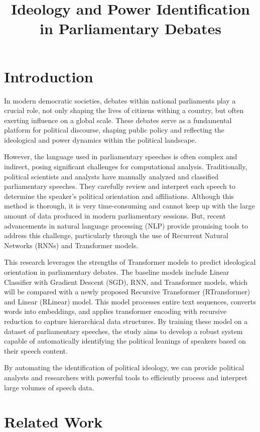 \documentclass[10pt, a4paper]{article}
\title{Ideology and Power Identification in Parliamentary Debates}
\begin{document}
\maketitleabstract

\section{Introduction}

In modern democratic societies, debates within national parliaments play a crucial role, not only shaping the lives of citizens withing a country, but often exerting influence on a global scale. These debates serve as a fundamental platform for political discourse, shaping public policy and reflecting the ideological and power dynamics within the political landscape.

However, the language used in parliamentary speeches is often complex and indirect, posing significant challenges for computational analysis. Traditionally, political scientists and analysts have manually analyzed and classified parliamentary speeches. They carefully review and interpret each speech to determine the speaker's political orientation and affiliations. Although this method is thorough, it is very time-consuming and cannot keep up with the large amount of data produced in modern parliamentary sessions. But, recent advancements in natural language processing (NLP) provide promising tools to address this challenge, particularly through the use of Recurrent Natural Networks (RNNs) and Transformer models. 

This research leverages the strengths of Transformer models to predict ideological orientation in parliamentary debates. The baseline models include Linear Classifier with Gradient Descent (SGD), RNN, and Transformer models, which will be compared with a newly proposed Recursive Transformer (RTransformer) and Linear (RLinear) model. This model processes entire text sequences, converts words into embeddings, and applies transformer encoding with recursive reduction to capture hierarchical data structures. By training these model on a dataset of parliamentary speeches, the study aims to develop a robust system capable of automatically identifying the political leanings of speakers based on their speech content.

By automating the identification of political ideology, we can provide political analysts and researchers with powerful tools to efficiently process and interpret large volumes of speech data.

\section{Related Work}
\end{document}
